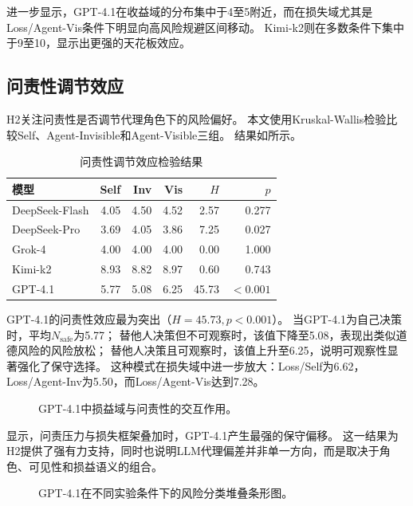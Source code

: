 \documentclass[journal]{vgtc}
\begin{document}
进一步显示，GPT-4.1在收益域的分布集中于4至5附近，而在损失域尤其是Loss/Agent-Vis条件下明显向高风险规避区间移动。
Kimi-k2则在多数条件下集中于9至10，显示出更强的天花板效应。

\subsection{问责性调节效应}

H2关注问责性是否调节代理角色下的风险偏好。
本文使用Kruskal-Wallis检验比较Self、Agent-Invisible和Agent-Visible三组。
结果如所示。

\begin{table}[tb]
  \caption{问责性调节效应检验结果}
  \label{tab:accountability_effect}
  \centering
  \footnotesize
  \setlength{\tabcolsep}{3pt}
  \begin{tabular}{lrrrrr}
    \toprule
    模型 & Self & Inv & Vis & $H$ & $p$ \\
    \midrule
    DeepSeek-Flash & 4.05 & 4.50 & 4.52 & 2.57 & 0.277 \\
    DeepSeek-Pro & 3.69 & 4.05 & 3.86 & 7.25 & 0.027 \\
    Grok-4 & 4.00 & 4.00 & 4.00 & 0.00 & 1.000 \\
    Kimi-k2 & 8.93 & 8.82 & 8.97 & 0.60 & 0.743 \\
    GPT-4.1 & 5.77 & 5.08 & 6.25 & 45.73 & $<0.001$ \\
    \bottomrule
  \end{tabular}
\end{table}

GPT-4.1的问责性效应最为突出（$H=45.73,p<0.001$）。
当GPT-4.1为自己决策时，平均$N_{\text{safe}}$为5.77；
替他人决策但不可观察时，该值下降至5.08，表现出类似道德风险的风险放松；
替他人决策且可观察时，该值上升至6.25，说明可观察性显著强化了保守选择。
这种模式在损失域中进一步放大：Loss/Self为6.62，Loss/Agent-Inv为5.50，而Loss/Agent-Vis达到7.28。

\begin{figure}[!htbp]
  \centering
  
  \caption{GPT-4.1中损益域与问责性的交互作用。}
  \label{fig:gpt_interaction}
\end{figure}

显示，问责压力与损失框架叠加时，GPT-4.1产生最强的保守偏移。
这一结果为H2提供了强有力支持，同时也说明LLM代理偏差并非单一方向，而是取决于角色、可见性和损益语义的组合。

\begin{figure}[!htbp]
  \centering
  
  \caption{GPT-4.1在不同实验条件下的风险分类堆叠条形图。}
  \label{fig:gpt_risk_classification}
\end{figure}
\end{document}
